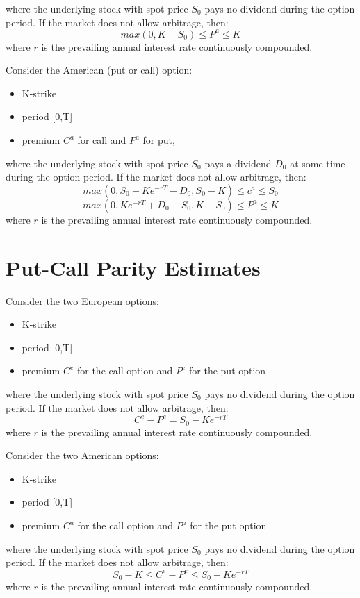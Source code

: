 \documentclass{report}
\begin{document}
where the underlying stock with spot price $S_0$ pays no dividend during the option period. If the market does not allow arbitrage, then:
\[max(0, K-S_0) \leq P^a \leq K\]
where $r$ is the prevailing annual interest rate continuously compounded.


Consider the American (put or call) option:
\begin{itemize}
    \item K-strike
    \item period [0,T]
    \item premium $C^a$ for call and $P^a$ for put,
\end{itemize}

where the underlying stock with spot price $S_0$ pays a dividend $D_0$ at some time during the option period. If the market does not allow arbitrage, then:
\[max(0, S_0-Ke^{-rT}-D_0, S_0-K) \leq c^a \leq S_0\]
\[max(0, Ke^{-rT}+D_0-S_0, K-S_0) \leq P^a \leq K\]
where $r$ is the prevailing annual interest rate continuously compounded.


\section{Put-Call Parity Estimates}
Consider the two European options:
\begin{itemize}
    \item K-strike
    \item period [0,T]
    \item premium $C^e$ for the call option and $P^e$ for the put option
\end{itemize}

where the underlying stock with spot price $S_0$ pays no dividend during the option period. If the market does not allow arbitrage, then:
\[C^e - P^e = S_0 - Ke^{-rT}\]
where $r$ is the prevailing annual interest rate continuously compounded.


Consider the two American options:
\begin{itemize}
    \item K-strike
    \item period [0,T]
    \item premium $C^a$ for the call option and $P^a$ for the put option
\end{itemize}

where the underlying stock with spot price $S_0$ pays no dividend during the option period. If the market does not allow arbitrage, then:
\[S_0-K \leq C^e - P^e \leq S_0 - Ke^{-rT}\]
where $r$ is the prevailing annual interest rate continuously compounded.
\end{document}
